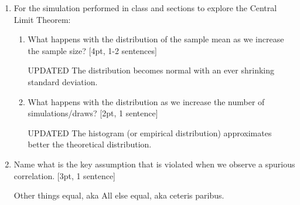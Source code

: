 \documentclass[answers]{exam}
\begin{document}
\begin{enumerate}
\item For the simulation performed in class and sections to explore the Central Limit Theorem: 
\begin{enumerate}
    \item What happens with the distribution of the sample mean as we increase the sample size? [4pt, 1-2 sentences]
   \begin{solution}
	UPDATED The distribution becomes normal with an ever shrinking standard deviation. 
	\end{solution}
    \item What happens with the distribution as we increase the number of simulations/draws? [2pt, 1 sentence]
    \begin{solution}
	UPDATED The histogram (or empirical distribution) approximates better the theoretical distribution. 
	\end{solution}
\end{enumerate}


\item Name what is the key assumption that is violated when we observe a spurious correlation. [3pt, 1 sentence]

    \begin{solution}
	Other things equal, aka All else equal, aka ceteris paribus.
	\end{solution}
	

\end{enumerate}
\end{document}
